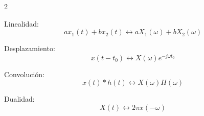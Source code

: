 \documentclass{article}
\begin{document}
\begin{multicols}{2}
\begin{itemform}
\end{itemform}
\begin{itemform}
  \item Linealidad: 
  $$ax_1(t)+bx_2(t) \leftrightarrow aX_1(\omega)+bX_2(\omega)$$
  \item Desplazamiento: 
  $$x(t-t_0) \leftrightarrow X(\omega)e^{-j\omega t_0}$$
  \item Convolución: 
  $$x(t)*h(t) \leftrightarrow X(\omega)H(\omega)$$
  \item Dualidad:
  $$X(t) \leftrightarrow 2\pi x(-\omega)$$
  \item 
\end{itemform}



\end{multicols}
                    
\end{document}
